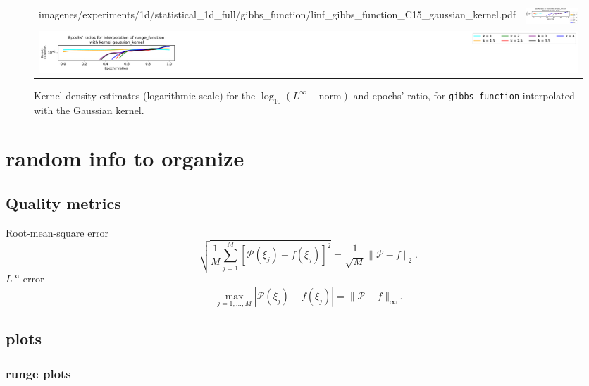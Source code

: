 \documentclass[12pt]{report} %
\begin{document}
\begin{figure}[H]
\begin{tabular}{rl}
{    {imagenes/experiments/1d/statistical_1d_full/gibbs_function/linf_gibbs_function_C15_gaussian_kernel.pdf}}
                                                                                                              & {\includegraphics[width=.62\textwidth, trim={1.05cm 1.4cm 2.88cm 1.17cm},clip=true]
        {imagenes/experiments/1d/statistical_1d_full/gibbs_function/epochs_gibbs_function_C15_gaussian_kernel.pdf}}
    \\
    \multicolumn{2}{c}{{\includegraphics[width=.55\textwidth, trim={46cm 2.9cm 0 0},clip=true]
          {imagenes/experiments/1d/statistical_1d_full/runge_function/runge_function_legend.pdf}}}
  \end{tabular}
  \caption{Kernel density estimates (logarithmic scale) for the $\log_{10}(L^\infty-\text{norm})$ and epochs' ratio, for \texttt{gibbs\_function} interpolated with the Gaussian kernel.}
  \label{fig:statistic-result-kde-gibbs-function-gaussian-kernel}
\end{figure}

\chapter{random info to organize}
\section{Quality metrics}

Root-mean-square error
\[ \sqrt{\frac{1}{M} \sum_{j = 1}^M [\mathcal{P} (\xi_j) - f (\xi_j)]^2} =
  \frac{1}{\sqrt{M}} \| \mathcal{P}- f \|_2 . \]
$L^{\infty}$ error
\[ \max_{j = 1, \ldots, M} | \mathcal{P} (\xi_j) - f (\xi_j) | = \|
  \mathcal{P}- f \|_{\infty} . \]
  

\section{plots}
\subsection{runge plots}
\end{document}
